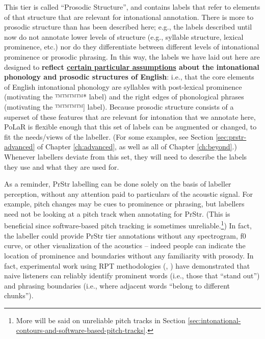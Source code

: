 \documentclass[11pt, twoside]{memoir}
\begin{document}
\begin{infobox}[frametitle=\textbf{A side-note about this tier}]
This tier is called “Prosodic Structure”, and contains labels that refer to elements of that structure that are relevant for intonational annotation. There is more to prosodic structure than has been described here; e.g., the labels described until now do not annotate lower levels of structure (e.g., syllable structure, lexical prominence, etc.) nor do they differentiate between different levels of intonational prominence or prosodic phrasing. In this way, the labels we have laid out here are designed to \textbf{reflect \uline{certain particular assumptions} about the intonational phonology and prosodic structures of English}: i.e., that the core elements of English intonational phonology are syllables with post-lexical prominence (motivating the ™™™™{*} label) and the right edges of phonological phrases (motivating the ™™™™{]} label). Because prosodic structure consists of a superset of these features that are relevant for intonation that we annotate here, PoLaR is flexible enough that this set of labels can be augmented or changed, to fit the needs\slash views of the labeller. (For some examples, see Section \ref{sec:prstr-advanced} of Chapter \ref{ch:advanced}, as well as all of Chapter \ref{ch:beyond}.) Whenever labellers deviate from this set, they will need to describe the labels they use and what they are used for.
\end{infobox}

As a reminder, PrStr labelling can be done solely on the basis of labeller perception, without any attention paid to particulars of the acoustic signal. For example, pitch changes may be cues to prominence or phrasing, but labellers need not be looking at a pitch track when annotating for PrStr. (This is beneficial since software-based pitch tracking is sometimes unreliable.\footnote{More will be said on unreliable pitch tracks in Section \ref{sec:intonational-contours-and-software-based-pitch-tracks}.}) In fact, the labeller could provide PrStr tier annotations without any spectrogram, f0 curve, or other visualization of the acoustics – indeed people can indicate the location of prominence and boundaries without any familiarity with prosody. In fact, experimental work using RPT methodologies (\citealt{cole-14, cole-17}, \citealt{cole-16}) have demonstrated that naive listeners can reliably identify prominent words (i.e., those that “stand out”) and phrasing boundaries (i.e., where adjacent words “belong to different chunks”).
\end{document}
